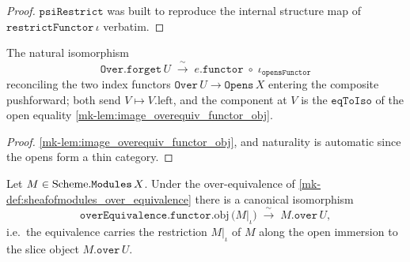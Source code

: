 \begin{proof}
  \leanok
  \(\mathtt{psiRestrict}\) was built to reproduce the internal structure map of
  \(\mathtt{restrictFunctor}\,\iota\) verbatim.
\end{proof}

\begin{definition}\label{mk-def:over_forget_nat_iso}
  \leanok

  The natural isomorphism
  \[
    \mathtt{Over.forget}\,U \;\xrightarrow{\ \sim\ }\;
      e.\mathtt{functor} \;\circ\; \iota_{\mathtt{opensFunctor}}
  \]
  reconciling the two index functors \(\mathtt{Over}\,U \to \mathtt{Opens}\,X\)
  entering the composite pushforward; both send \(V \mapsto V.\mathrm{left}\), and the
  component at \(V\) is the \(\mathtt{eqToIso}\) of the open equality
  \ref{mk-lem:image_overequiv_functor_obj}.
\end{definition}

\begin{proof}
  \leanok
  \ref{mk-lem:image_overequiv_functor_obj}, and naturality is automatic since the opens
  form a thin category.
\end{proof}

\begin{lemma}\label{mk-lem:sheafofmodules_restrict_over_iso}
  \leanok

  Let \(M \in \mathrm{Scheme}.\mathtt{Modules}\,X\). Under the over-equivalence of
  \ref{mk-def:sheafofmodules_over_equivalence} there is a canonical isomorphism
  \[
    \mathtt{overEquivalence}.\mathtt{functor}.\mathrm{obj}\,\bigl(M|_\iota\bigr)
      \;\xrightarrow{\ \sim\ }\;
    M.\mathtt{over}\,U,
  \]
  i.e.\ the equivalence carries the restriction \(M|_\iota\) of \(M\) along the
  open immersion to the slice object \(M.\mathtt{over}\,U\).
\end{lemma}

